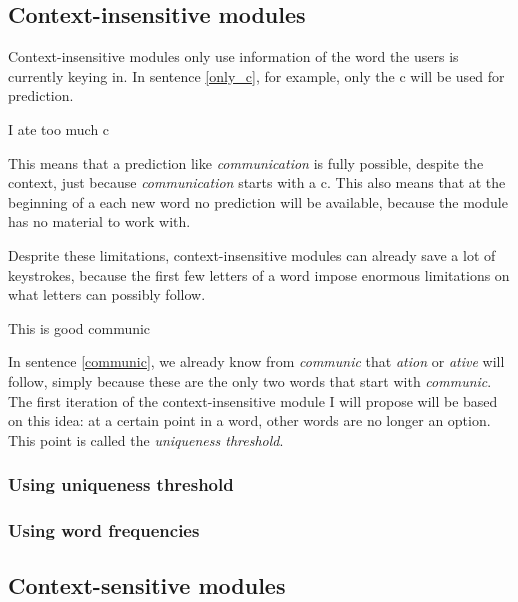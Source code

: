 \documentclass[12pt]{article}
\begin{document}

\subsection{Context-insensitive modules} \label{ci}

Context-insensitive modules only use information of the word the users is currently keying in. In sentence \ref{only_c}, for example, only the c will be used for prediction. 

\begin{examples}
\item I ate too much c \label{only_c}
\end{examples}

This means that a prediction like \emph{communication} is fully possible, despite the context, just because \emph{communication} starts with a c. This also means that at the beginning of a each new word no prediction will be available, because the module has no material to work with.

Desprite these limitations, context-insensitive modules can already save a lot of keystrokes, because the first few letters of a word impose enormous limitations on what letters can possibly follow.

\begin{examples}
\item This is good communic \label{communic}
\end{examples}

In sentence \ref{communic}, we already know from \emph{communic} that \emph{ation} or \emph{ative} will follow, simply because these are the only two words that start with \emph{communic}. The first iteration of the context-insensitive module I will propose will be based on this idea: at a certain point in a word, other words are no longer an option. This point is called the \emph{uniqueness threshold}.

\subsubsection{Using uniqueness threshold}

\subsubsection{Using word frequencies}

\subsection{Context-sensitive modules} \label{cs}
\end{document}
